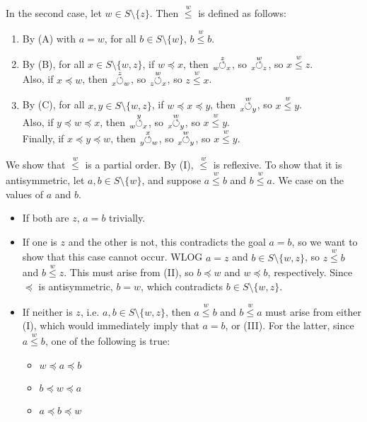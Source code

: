 \documentclass{article}
\newcommand{\ternary}[4]{\hspace{-1mm}\tensor[_{#3}]{\overset{#2}{#1}}{_{#4}}}
\newcommand{\cyc}[3]{\ternary{\circlearrowleft}{#1}{#2}{#3}}
\newcommand{\po}[1]{\overset{#1}{\leq}}
\begin{document}
\begin{enumerate}[label=(\roman*)]
  In the second case, let $w \in S \setminus \{z\}$.
  Then $\po{w}$ is defined as follows:
  \begin{enumerate}[label=(\Roman*)]
  \item
    By (A) with $a = w$, for all $b \in S \setminus \{w\}$, $b \po{w} b$.
  \item
    By (B), for all $x \in S \setminus \{w, z\}$,
    if $w \preceq x$, then $\cyc{z}{w}{x}$,
    so $\cyc{w}{x}{z}$, so $x \po{w} z$. \\
    Also, if $x \preceq w$, then $\cyc{z}{x}{w}$,
    so $\cyc{w}{z}{x}$, so $z \po{w} x$.
  \item
    By (C), for all $x, y \in S \setminus \{w, z\}$,
    if $w \preceq x \preceq y$, then $\cyc{w}{x}{y}$,
    so $x \po{w} y$. \\
    Also, if $y \preceq w \preceq x$, then $\cyc{y}{w}{x}$,
    so $\cyc{w}{x}{y}$, so $x \po{w} y$. \\
    Finally, if $x \preceq y \preceq w$, then $\cyc{x}{y}{w}$,
    so $\cyc{w}{x}{y}$, so $x \po{w} y$.
  \end{enumerate}
  We show that $\po{w}$ is a partial order.
  By (I), $\po{w}$ is reflexive.
  To show that it is antisymmetric,
  let $a, b \in S \setminus \{w\}$,
  and suppose $a \po{w} b$ and $b \po{w} a$.
  We case on the values of $a$ and $b$.
  \begin{itemize}
  \item
    If both are $z$, $a = b$ trivially.
  \item
    If one is $z$ and the other is not,
    this contradicts the goal $a = b$,
    so we want to show that this case cannot occur.
    WLOG $a = z$ and $b \in S \setminus \{w, z\}$,
    so $z \po{w} b$ and $b \po{w} z$.
    This must arise from (II),
    so $b \preceq w$ and $w \preceq b$, respectively.
    Since $\preceq$ is antisymmetric, $b = w$,
    which contradicts $b \in S \setminus \{w, z\}$.
  \item
    If neither is $z$,
    i.e. $a, b \in S \setminus \{w, z\}$,
    then $a \po{w} b$ and $b \po{w} a$
    must arise from either (I),
    which would immediately imply that $a = b$,
    or (III).
    For the latter, since $a \po{w} b$,
    one of the following is true:
    \begin{itemize}
    \item $w \preceq a \preceq b$
    \item $b \preceq w \preceq a$
    \item $a \preceq b \preceq w$
    \end{itemize}

\end{itemize}
\end{enumerate}
\end{document}
